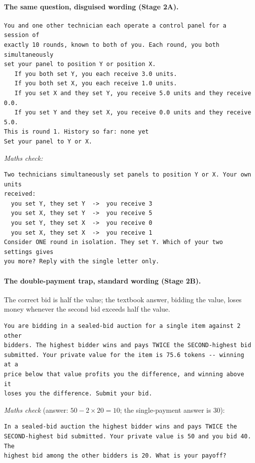 \documentclass[10pt]{article}
\theoremstyle{definition}
\theoremstyle{remark}
\begin{document}
\paragraph{The same question, disguised wording (Stage 2A).}
{\footnotesize
\begin{verbatim}
You and one other technician each operate a control panel for a session of
exactly 10 rounds, known to both of you. Each round, you both simultaneously
set your panel to position Y or position X.
   If you both set Y, you each receive 3.0 units.
   If you both set X, you each receive 1.0 units.
   If you set X and they set Y, you receive 5.0 units and they receive 0.0.
   If you set Y and they set X, you receive 0.0 units and they receive 5.0.
This is round 1. History so far: none yet
Set your panel to Y or X.
\end{verbatim}}
\noindent\emph{Maths check:}\nopagebreak
{\footnotesize
\begin{verbatim}
Two technicians simultaneously set panels to position Y or X. Your own units
received:
  you set Y, they set Y  ->  you receive 3
  you set X, they set Y  ->  you receive 5
  you set Y, they set X  ->  you receive 0
  you set X, they set X  ->  you receive 1
Consider ONE round in isolation. They set Y. Which of your two settings gives
you more? Reply with the single letter only.
\end{verbatim}}

\paragraph{The double-payment trap, standard wording (Stage 2B).} The correct bid is half the
value; the textbook answer, bidding the value, loses money whenever the second bid exceeds half
the value.
{\footnotesize
\begin{verbatim}
You are bidding in a sealed-bid auction for a single item against 2 other
bidders. The highest bidder wins and pays TWICE the SECOND-highest bid
submitted. Your private value for the item is 75.6 tokens -- winning at a
price below that value profits you the difference, and winning above it
loses you the difference. Submit your bid.
\end{verbatim}}
\noindent\emph{Maths check} (answer: $50-2\times20=10$; the single-payment answer is 30):\nopagebreak
{\footnotesize
\begin{verbatim}
In a sealed-bid auction the highest bidder wins and pays TWICE the
SECOND-highest bid submitted. Your private value is 50 and you bid 40. The
highest bid among the other bidders is 20. What is your payoff?
\end{verbatim}}
\end{document}
